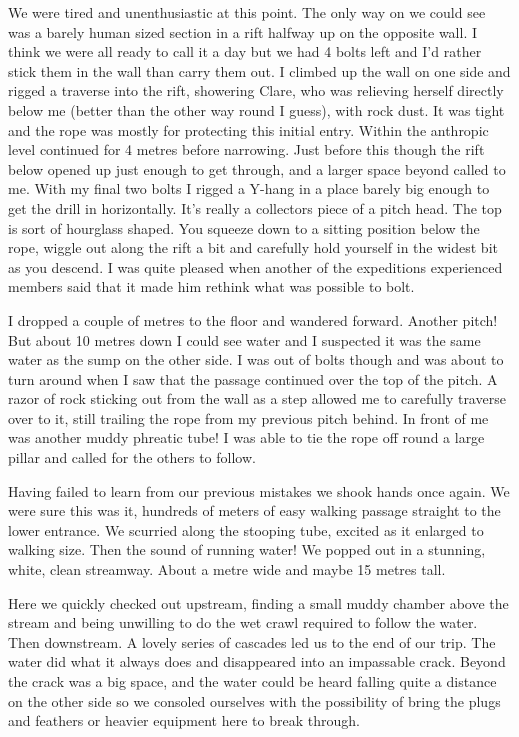 We were tired and unenthusiastic at this point. The only way on we could see was a barely human sized section in a rift halfway up on the opposite wall. I think we were all ready to call it a day but we had 4 bolts left and I'd rather stick them in the wall than carry them out. I climbed up the wall on one side and rigged a traverse into the rift, showering Clare, who was relieving herself directly below me (better than the other way round I guess), with rock dust. It was tight and the rope was mostly for protecting this initial entry. Within the anthropic level continued for 4 metres before narrowing. Just before this though the rift below opened up just enough to get through, and a larger space beyond called to me. With my final two bolts I rigged a Y-hang in a place barely big enough to get the drill in horizontally. It's really a collectors piece of a pitch head. The top is sort of hourglass shaped. You squeeze down to a sitting position below the rope, wiggle out along the rift a bit and carefully hold yourself in the widest bit as you descend. I was quite pleased when another of the expeditions experienced members said that it made him rethink what was possible to bolt.


 
I dropped a couple of metres to the floor and wandered forward. Another pitch! But about 10 metres down I could see water and I suspected it was the same water as the sump on the other side. I was out of bolts though and was about to turn around when I saw that the passage continued over the top of the pitch. A razor of rock sticking out from the wall as a step allowed me to carefully traverse over to it, still trailing the rope from my previous pitch behind. In front of me was another muddy phreatic tube! I was able to tie the rope off round a large pillar and called for the others to follow.

 
Having failed to learn from our previous mistakes we shook hands once again. We were sure this was it, hundreds of meters of easy walking passage straight to the lower entrance. We scurried along the stooping tube, excited as it enlarged to walking size. Then the sound of running water! We popped out in a stunning, white, clean streamway. About a metre wide and maybe 15 metres tall.


 
Here we quickly checked out upstream, finding a small muddy chamber above the stream and being unwilling to do the wet crawl required to follow the water. Then downstream. A lovely series of cascades led us to the end of our trip. The water did what it always does and disappeared into an impassable crack. Beyond the crack was a big space, and the water could be heard falling quite a distance on the other side so we consoled ourselves with the possibility of bring the plugs and feathers or heavier equipment here to break through.
 
